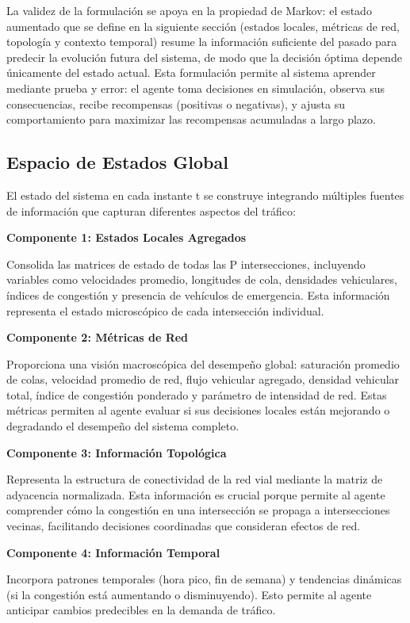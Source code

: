 \documentclass[12pt,a4paper,oneside]{report}
\begin{document}
La validez de la formulación se apoya en la propiedad de Markov: el estado aumentado que se define en la siguiente sección (estados locales, métricas de red, topología y contexto temporal) resume la información suficiente del pasado para predecir la evolución futura del sistema, de modo que la decisión óptima depende únicamente del estado actual. Esta formulación permite al sistema aprender mediante prueba y error: el agente toma decisiones en simulación, observa sus consecuencias, recibe recompensas (positivas o negativas), y ajusta su comportamiento para maximizar las recompensas acumuladas a largo plazo.

\subsection{Espacio de Estados Global}\label{espacio-de-estados-global}

El estado del sistema en cada instante t se construye integrando múltiples fuentes de información que capturan diferentes aspectos del tráfico:

\textbf{Componente 1: Estados Locales Agregados}

Consolida las matrices de estado de todas las P intersecciones, incluyendo variables como velocidades promedio, longitudes de cola, densidades vehiculares, índices de congestión y presencia de vehículos de emergencia. Esta información representa el estado microscópico de cada intersección individual.

\textbf{Componente 2: Métricas de Red}

Proporciona una visión macroscópica del desempeño global: saturación promedio de colas, velocidad promedio de red, flujo vehicular agregado, densidad vehicular total, índice de congestión ponderado y parámetro de intensidad de red. Estas métricas permiten al agente evaluar si sus decisiones locales están mejorando o degradando el desempeño del sistema completo.

\textbf{Componente 3: Información Topológica}

Representa la estructura de conectividad de la red vial mediante la matriz de adyacencia normalizada. Esta información es crucial porque permite al agente comprender cómo la congestión en una intersección se propaga a intersecciones vecinas, facilitando decisiones coordinadas que consideran efectos de red.

\textbf{Componente 4: Información Temporal}

Incorpora patrones temporales (hora pico, fin de semana) y tendencias dinámicas (si la congestión está aumentando o disminuyendo). Esto permite al agente anticipar cambios predecibles en la demanda de tráfico.
\end{document}
